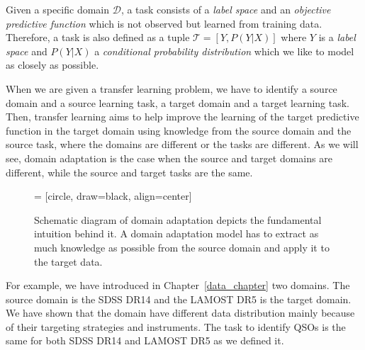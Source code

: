 Given a specific domain \(\mathcal{D}\),
a task consists of a \textit{label space} and an \textit{objective predictive function}
which is not observed but learned from training data.
Therefore, a task is also defined as a tuple \(\mathcal{T} = [Y, P(Y | X)]\)
where \(Y\) is a \textit{label space}
and \(P(Y | X)\) a \textit{conditional probability distribution}
which we like to model as closely as possible.

When we are given a transfer learning problem,
we have to identify a source domain and a source learning task,
a target domain and a target learning task.
Then, transfer learning aims to help improve the learning of the target predictive function in the target domain
using knowledge from the source domain and the source task,
where the domains are different or the tasks are different.
As we will see, domain adaptation is the case
when the source and target domains are different,
while the source and target tasks are the same.~\cite{pan2010}

\begin{figure}
\begin{center}
 = [circle, draw=black, align=center]
\end{center}
\caption[Schematic depiction of domain adaptation]{
	Schematic diagram of domain adaptation depicts the fundamental intuition behind it.
	A domain adaptation model has to extract as much knowledge as possible from the source domain
	and apply it to the target data.
	}
\end{figure}

For example, we have introduced in Chapter~\ref{data_chapter}
two domains.
The source domain is the SDSS DR14 and the LAMOST DR5 is the target domain.
We have shown that the domain have different data distribution
mainly because of their targeting strategies and instruments.
The task to identify QSOs is the same for both SDSS DR14 and LAMOST DR5
as we defined it.

